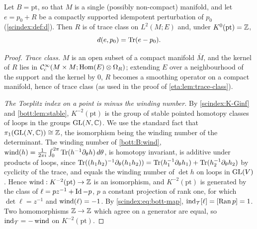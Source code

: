 \begin{lemma}\label{solsemiclassical-index:lem:d-trace}
  Let $B=\mathrm{pt}$, so that $M$ is a single (possibly non-compact) manifold,
  and let $e=p_0+R$ be a compactly supported idempotent perturbation of $p_0$
  (\cref{scindex:def:d}). Then $R$ is of trace class on $L^2(M;E)$ and, under
  $K^0(\mathrm{pt})=\mathbb{Z}$,
  \begin{equation}\label{solsemiclassical-index:eq:d-trace}
    d(e,p_0)=\operatorname{Tr}(e-p_0).
  \end{equation}
\end{lemma}
\begin{proof}
  \emph{Trace class.} $M$ is an open subset of a compact manifold $\bar M$, and
  the kernel of $R$ lies in $\mathcal{C}^\infty_{\mathrm{c}}(M\times M;\operatorname{Hom}(E)\otimes\Omega_R)$; extending
  $E$ over a neighbourhood of the support and the kernel by $0$, $R$ becomes a
  smoothing operator on a compact manifold, hence of trace class (as used in the
  proof of \cref{eta:lem:trace-class}).

  \emph{The Toeplitz index on a point is minus the winding number.} By
  \ref{scindex:K-Ginf} and \cref{bott:lem:stable}, $K^{-2}(\mathrm{pt})$ is the
  group of stable pointed homotopy classes of loops in the groups $\operatorname{GL}(N,\mathbb{C})$. We
  use the standard fact that $\pi_1(\operatorname{GL}(N,\mathbb{C}))\cong\mathbb{Z}$, the isomorphism being the
  winding number of the determinant. The winding number of \ref{bott:B:wind},
  $\operatorname{wind}(h)=\frac1{2\pi i}\int_0^{2\pi}\operatorname{Tr}(h^{-1}\partial_\theta h)\,d\theta$, is
  homotopy invariant, is additive under products of loops, since
  $\operatorname{Tr}((h_1h_2)^{-1}\partial_\theta(h_1h_2))=\operatorname{Tr}(h_1^{-1}\partial_\theta h_1)+
  \operatorname{Tr}(h_2^{-1}\partial_\theta h_2)$ by cyclicity of the trace, and equals the winding
  number of $\det h$ on loops in $\operatorname{GL}(V)$. Hence $\operatorname{wind}:K^{-2}(\mathrm{pt})\to\mathbb{Z}$ is
  an isomorphism, and $K^{-2}(\mathrm{pt})$ is generated by the class of
  $\ell=pz^{-1}+\operatorname{Id}-p$, $p$ a constant projection of rank one, for which
  $\det\ell=z^{-1}$ and $\operatorname{wind}(\ell)=-1$. By \eqref{scindex:eq:bott-map},
  $\operatorname{ind}_{\mathcal T}[\ell]=[\operatorname{Ran} p]=1$. Two homomorphisms $\mathbb{Z}\to\mathbb{Z}$ which agree on a generator
  are equal, so $\operatorname{ind}_{\mathcal T}=-\operatorname{wind}$ on $K^{-2}(\mathrm{pt})$.


\end{proof}
